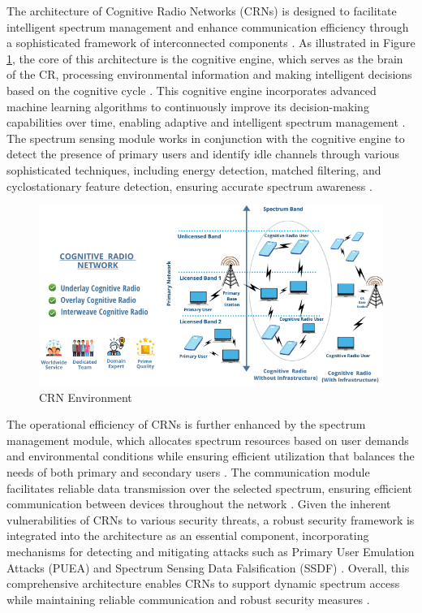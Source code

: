 The architecture of Cognitive Radio Networks (CRNs) is designed to facilitate intelligent spectrum management and enhance communication efficiency through a sophisticated framework of interconnected components \cite{ref1,ref2}. As illustrated in Figure \ref{fig:CRN_arc}, the core of this architecture is the cognitive engine, which serves as the brain of the CR, processing environmental information and making intelligent decisions based on the cognitive cycle \cite{ref1}. This cognitive engine incorporates advanced machine learning algorithms to continuously improve its decision-making capabilities over time, enabling adaptive and intelligent spectrum management \cite{ref9,ref19}. The spectrum sensing module works in conjunction with the cognitive engine to detect the presence of primary users and identify idle channels through various sophisticated techniques, including energy detection, matched filtering, and cyclostationary feature detection, ensuring accurate spectrum awareness \cite{ref4,ref6,ref11}.

\begin{figure}[ht]
    \centering
    \includegraphics[width=\linewidth]{Figures/chapter1/CRN-Thesis.png}
    \caption{CRN Environment \cite{ref28}}
    \label{fig:CRN_arc}
\end{figure}

The operational efficiency of CRNs is further enhanced by the spectrum management module, which allocates spectrum resources based on user demands and environmental conditions while ensuring efficient utilization that balances the needs of both primary and secondary users \cite{ref1,ref3}. The communication module facilitates reliable data transmission over the selected spectrum, ensuring efficient communication between devices throughout the network \cite{ref2}. Given the inherent vulnerabilities of CRNs to various security threats, a robust security framework is integrated into the architecture as an essential component, incorporating mechanisms for detecting and mitigating attacks such as Primary User Emulation Attacks (PUEA) and Spectrum Sensing Data Falsification (SSDF) \cite{ref1,ref7,ref25}. Overall, this comprehensive architecture enables CRNs to support dynamic spectrum access while maintaining reliable communication and robust security measures \cite{ref1,ref25}.

